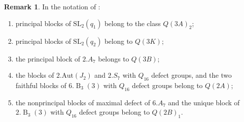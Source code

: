 \documentclass{amsart}
\theoremstyle{plain}\newtheorem{Theorem}{Theorem}[section]
\theoremstyle{plain}\newtheorem{Conjecture}[Theorem]{Conjecture}
\theoremstyle{plain}\newtheorem{Corollary}[Theorem]{Corollary}
\theoremstyle{plain}\newtheorem{Lemma}[Theorem]{Lemma}
\theoremstyle{plain}\newtheorem{Proposition}[Theorem]{Proposition}
\theoremstyle{definition}\newtheorem{Definition}[Theorem]{Definition}
\theoremstyle{definition}\newtheorem{Example}[Theorem]{Example}
\theoremstyle{definition}\newtheorem{Examples}[Theorem]{Examples}
\theoremstyle{definition}\newtheorem{Exercise}[Theorem]{Exercise}
\theoremstyle{definition}\newtheorem{Notation}[Theorem]{Notation}
\theoremstyle{definition}\newtheorem{Remark}[Theorem]{Remark}
\theoremstyle{definition}\newtheorem{Remarks}[Theorem]{Remarks}
\def\Aut{\mathrm{Aut}}               \def\tenk{\otimes_k}
\def\SL{\mathrm{SL}}
\newcommand{\type}{\operatorname}
\numberwithin{equation}{section}
\begin{document}
\begin{Remark}
In the notation of :
\begin{enumerate}
    \item principal blocks of $\SL_2(q_1)$ belong to the class $Q(3A)_2$;
    \item principal blocks of $\SL_2(q_2)$ belong to $Q(3K)$;
    \item the principal block of $2.A_7$ belongs to $Q(3B)$;
    \item the blocks of $2.\Aut(J_2)$ and $2.S_7$ with $Q_{16}$ defect groups, and the two faithful blocks of $6.\type{B}_3(3)$ with $Q_{16}$ defect groups belong to $Q(2A)$;
    \item the nonprincipal blocks of maximal defect of $6.A_7$ and the unique block of $2.\type{B}_3(3)$ with $Q_{16}$ defect groups belong to $Q(2B)_1$.
\end{enumerate}
\end{Remark}


 
\end{document}
